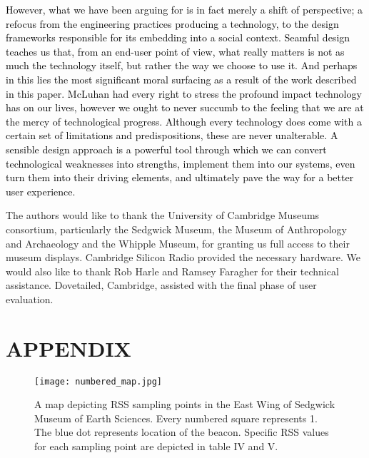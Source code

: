 \documentclass[prodmode,acmtomm]{acmsmall}
\begin{document}
\textcolor{black}{However, what we have been arguing for is in fact merely a shift of perspective; a refocus from the engineering practices producing a technology, to the design frameworks responsible for its embedding into a social context. Seamful design teaches us that, from an end-user point of view, what really matters is not as much the technology itself, but rather the way we choose to use it. And perhaps in this lies the most significant moral surfacing as a result of the work described in this paper. McLuhan had every right to stress the profound impact technology has on our lives,  however we ought to never succumb to the feeling that we are at the mercy of technological progress. Although every technology does come with a certain set of limitations and predispositions, these are never unalterable. A sensible design approach is a powerful tool through which we can convert technological weaknesses into strengths, implement them into our systems, even turn them into their driving elements, and ultimately pave the way for a better user experience.} 

\begin{acks}
The authors would like to thank the University of Cambridge Museums consortium, particularly the Sedgwick Museum, the Museum of Anthropology and Archaeology and the Whipple Museum, for granting us full access to their museum displays. Cambridge Silicon Radio provided the necessary hardware. We would also like to thank Rob Harle and Ramsey Faragher for their technical assistance. Dovetailed, Cambridge, assisted with the final phase of user evaluation. \end{acks}

\hfill


\vspace{-12pt}



\hfill
\hfill
\appendix
\section*{APPENDIX}
\setcounter{section}{1}



\begin{figure}[h!]
\begin{center}
\begin{center}
\texttt{[image: numbered\_map.jpg]}
\end{center}
\caption{A map depicting RSS sampling points in the East Wing of Sedgwick Museum of Earth Sciences. Every numbered square represents 1. The blue dot represents location of the beacon. Specific RSS values for each sampling point are depicted in table IV and V.}
\end{center}
\end{figure}
\end{document}
